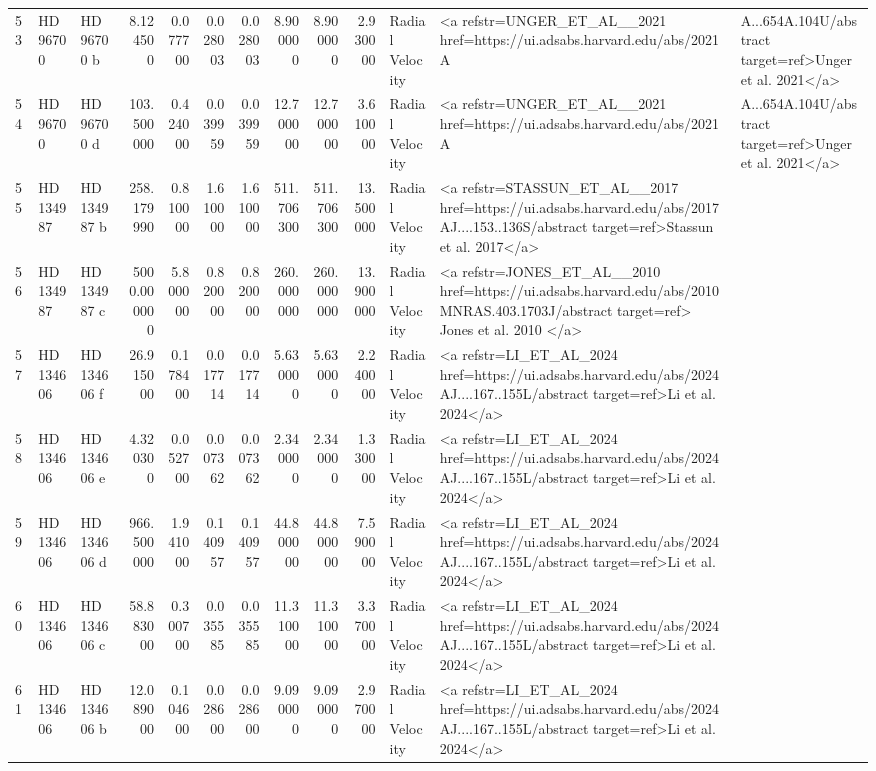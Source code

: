 \begin{tabular}{lllrrrrrrrll}
53 & HD 96700 & HD 96700 b & 8.124500 & 0.077700 & 0.028003 & 0.028003 & 8.900000 & 8.900000 & 2.930000 & Radial Velocity & <a refstr=UNGER_ET_AL__2021 href=https://ui.adsabs.harvard.edu/abs/2021A&A...654A.104U/abstract target=ref>Unger et al. 2021</a> \\
54 & HD 96700 & HD 96700 d & 103.500000 & 0.424000 & 0.039959 & 0.039959 & 12.700000 & 12.700000 & 3.610000 & Radial Velocity & <a refstr=UNGER_ET_AL__2021 href=https://ui.adsabs.harvard.edu/abs/2021A&A...654A.104U/abstract target=ref>Unger et al. 2021</a> \\
55 & HD 134987 & HD 134987 b & 258.179990 & 0.810000 & 1.610000 & 1.610000 & 511.706300 & 511.706300 & 13.500000 & Radial Velocity & <a refstr=STASSUN_ET_AL__2017 href=https://ui.adsabs.harvard.edu/abs/2017AJ....153..136S/abstract target=ref>Stassun et al. 2017</a> \\
56 & HD 134987 & HD 134987 c & 5000.000000 & 5.800000 & 0.820000 & 0.820000 & 260.000000 & 260.000000 & 13.900000 & Radial Velocity & <a refstr=JONES_ET_AL__2010 href=https://ui.adsabs.harvard.edu/abs/2010MNRAS.403.1703J/abstract target=ref> Jones et al. 2010 </a> \\
57 & HD 134606 & HD 134606 f & 26.915000 & 0.178400 & 0.017714 & 0.017714 & 5.630000 & 5.630000 & 2.240000 & Radial Velocity & <a refstr=LI_ET_AL_2024 href=https://ui.adsabs.harvard.edu/abs/2024AJ....167..155L/abstract target=ref>Li et al. 2024</a> \\
58 & HD 134606 & HD 134606 e & 4.320300 & 0.052700 & 0.007362 & 0.007362 & 2.340000 & 2.340000 & 1.330000 & Radial Velocity & <a refstr=LI_ET_AL_2024 href=https://ui.adsabs.harvard.edu/abs/2024AJ....167..155L/abstract target=ref>Li et al. 2024</a> \\
59 & HD 134606 & HD 134606 d & 966.500000 & 1.941000 & 0.140957 & 0.140957 & 44.800000 & 44.800000 & 7.590000 & Radial Velocity & <a refstr=LI_ET_AL_2024 href=https://ui.adsabs.harvard.edu/abs/2024AJ....167..155L/abstract target=ref>Li et al. 2024</a> \\
60 & HD 134606 & HD 134606 c & 58.883000 & 0.300700 & 0.035585 & 0.035585 & 11.310000 & 11.310000 & 3.370000 & Radial Velocity & <a refstr=LI_ET_AL_2024 href=https://ui.adsabs.harvard.edu/abs/2024AJ....167..155L/abstract target=ref>Li et al. 2024</a> \\
61 & HD 134606 & HD 134606 b & 12.089000 & 0.104600 & 0.028600 & 0.028600 & 9.090000 & 9.090000 & 2.970000 & Radial Velocity & <a refstr=LI_ET_AL_2024 href=https://ui.adsabs.harvard.edu/abs/2024AJ....167..155L/abstract target=ref>Li et al. 2024</a> \\

\end{tabular}
